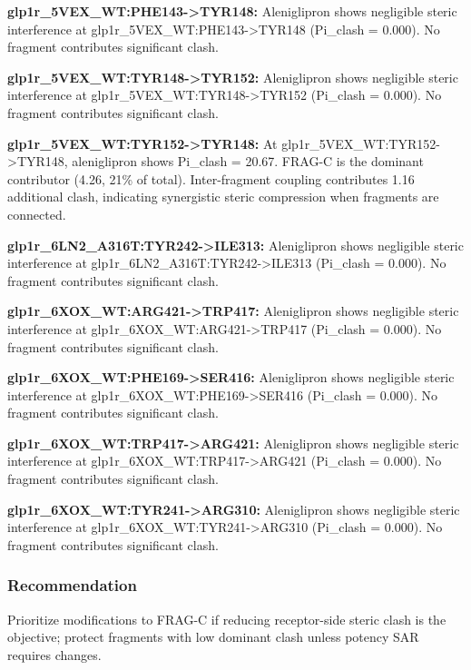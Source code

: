 \documentclass[11pt,a4paper]{article}
\begin{document}
\textbf{glp1r\_5VEX\_WT:PHE143-\textgreater TYR148:} Aleniglipron shows negligible steric
interference at glp1r\_5VEX\_WT:PHE143-\textgreater TYR148 (Pi\_clash = 0.000). No fragment
contributes significant clash.

\textbf{glp1r\_5VEX\_WT:TYR148-\textgreater TYR152:} Aleniglipron shows negligible steric
interference at glp1r\_5VEX\_WT:TYR148-\textgreater TYR152 (Pi\_clash = 0.000). No fragment
contributes significant clash.

\textbf{glp1r\_5VEX\_WT:TYR152-\textgreater TYR148:} At glp1r\_5VEX\_WT:TYR152-\textgreater TYR148,
aleniglipron shows Pi\_clash = 20.67. FRAG-C is the dominant contributor (4.26, 21\% of total).
Inter-fragment coupling contributes 1.16 additional clash, indicating synergistic steric compression
when fragments are connected.

\textbf{glp1r\_6LN2\_A316T:TYR242-\textgreater ILE313:} Aleniglipron shows negligible steric
interference at glp1r\_6LN2\_A316T:TYR242-\textgreater ILE313 (Pi\_clash = 0.000). No fragment
contributes significant clash.

\textbf{glp1r\_6XOX\_WT:ARG421-\textgreater TRP417:} Aleniglipron shows negligible steric
interference at glp1r\_6XOX\_WT:ARG421-\textgreater TRP417 (Pi\_clash = 0.000). No fragment
contributes significant clash.

\textbf{glp1r\_6XOX\_WT:PHE169-\textgreater SER416:} Aleniglipron shows negligible steric
interference at glp1r\_6XOX\_WT:PHE169-\textgreater SER416 (Pi\_clash = 0.000). No fragment
contributes significant clash.

\textbf{glp1r\_6XOX\_WT:TRP417-\textgreater ARG421:} Aleniglipron shows negligible steric
interference at glp1r\_6XOX\_WT:TRP417-\textgreater ARG421 (Pi\_clash = 0.000). No fragment
contributes significant clash.

\textbf{glp1r\_6XOX\_WT:TYR241-\textgreater ARG310:} Aleniglipron shows negligible steric
interference at glp1r\_6XOX\_WT:TYR241-\textgreater ARG310 (Pi\_clash = 0.000). No fragment
contributes significant clash.

\hypertarget{recommendation}{%
\subsubsection{Recommendation}\label{recommendation}}

Prioritize modifications to FRAG-C if reducing receptor-side steric clash is the objective; protect
fragments with low dominant clash unless potency SAR requires changes.
\end{document}
